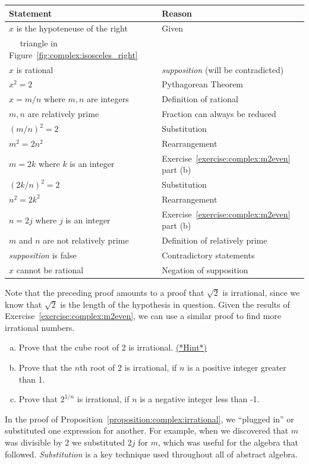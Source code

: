 \begin{tabular}{l| l}
Statement& Reason\\
\hline
$x$ is the hypoteneuse of the right & Given\\
~~ triangle in Figure~\ref{fig:complex:isosceles_right} & ~\\
$x$ is rational & \emph{supposition} (will be contradicted)\\
$x^2 = 2$ & Pythagorean Theorem\\
$x = m/n$ where $m,n$ are integers& Definition of rational\\
$m, n$ are relatively prime & Fraction can always be reduced\\
$(m/n)^2 = 2$ & Substitution\\
$m^2 = 2n^2$ & Rearrangement\\
$m = 2k$ where $k$ is an integer & Exercise~\ref{exercise:complex:m2even} part (b)\\
$(2k/n)^2 = 2$ & Substitution\\
$n^2 = 2k^2$& Rearrangement\\
$n = 2j$ where  $j$ is an integer&Exercise~\ref{exercise:complex:m2even} part (b)\\
$m$ and $n$ are not relatively prime& Definition of relatively prime\\
\emph{supposition} is false & Contradictory statements\\
$x$ cannot be rational &  Negation of supposition
\end{tabular}

Note that the preceding proof amounts to a proof that $\sqrt{2}$ is irrational, since we know that $\sqrt{2}$ is the length of the hypothesis in question. Given the results of Exercise~\ref{exercise:complex:m2even}, we can use a similar proof to find more irrational numbers.

\begin{exercise}{6}
\begin{enumerate}[(a)]
\item
Prove that the cube root of 2 is irrational.
\hyperref[sec:complex:hints]{(*Hint*)} 
\item
Prove that the $n$th root of 2 is irrational, if $n$ is a positive integer greater than 1.
\item
Prove that $2^{1/n}$ is irrational, if $n$ is a negative integer less than -1.
\end{enumerate}
\end{exercise}

In the proof of Proposition~\ref{proposition:complex:irrational},  we ``plugged in'' or substituted one expression for another.   For example, when we discovered that $m$ was divisible by 2 we substituted $2j$ for $m$, which was useful for the algebra that followed.
\emph{Substitution} is a key technique used throughout all of abstract algebra.

